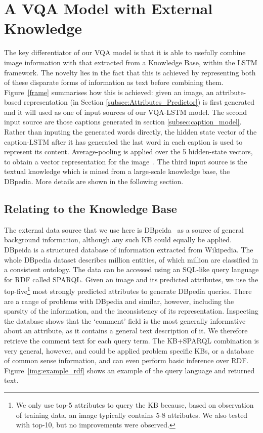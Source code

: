 \documentclass[10pt,journal,compsoc]{IEEEtran}
\begin{document}
\section{A VQA Model with External Knowledge}
\label{sec:vqa}
The key differentiator of our VQA model is that it is able to usefully combine image information with that extracted from a Knowledge Base, within the LSTM framework. The novelty lies in the fact that this is achieved by representing both of these disparate forms of information as text before combining them. Figure~\ref{frame} summarises how this is achieved: given an image, an attribute-based  representation  (in Section \ref{subsec:Attributes_Predictor}) is first generated and it will used as one of input sources of our VQA-LSTM model. The second input source are those captions generated in section \ref{subsec:caption_model}. Rather than inputing the generated words directly, the hidden state vector of the caption-LSTM after it has generated the last word in each caption is used to represent its content. Average-pooling is applied over the 5 hidden-state vectors, to obtain a vector representation  for the image~. The third input source is the textual knowledge which is mined from a large-scale knowledge base, the DBpedia. More details are shown in the following section.

\subsection{Relating to the Knowledge Base}

The external data source that we use here is DBpeida~\cite{auer2007dbpedia} as a source of general background information, although any such KB could equally be applied. DBpeida is a structured database of information extracted from Wikipedia. The whole DBpedia dataset describes  million entities, of which  million are classified in a consistent ontology. The data can be accessed using an SQL-like query language for RDF called SPARQL. Given an image and its predicted attributes, we use the top-five\footnote{We only use top-5 attributes to query the KB because, based on observation of training data, an image typically contains 5-8 attributes. We also tested with top-10, but no improvements were observed.} most strongly predicted attributes to generate DBpedia queries. There are a range of problems with DBpedia and similar, however, including the sparsity of the information, and the inconsistency of its representation. Inspecting the database shows that the `comment' field is the most generally informative about an attribute, as it contains a general text description of it.  We therefore retrieve the comment text for each query term. The KB+SPARQL combination is very general, however, and could be applied problem specific KBs, or a database of common sense information, and can even perform basic inference over RDF. Figure~\ref{img:example_rdf} shows an example of the query language and returned text.
\end{document}
